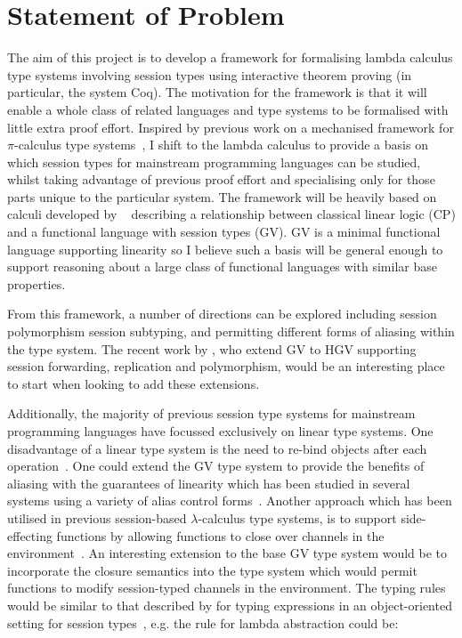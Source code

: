 \documentclass{mprop}
\newcommand{\1}{\textbf{1}\xspace}
\begin{document}
\section{Statement of Problem}

The aim of this project is to develop a framework for formalising lambda
calculus type systems involving session types using interactive theorem
proving (in particular, the system Coq). The motivation for the framework is
that it will enable a whole class of related languages and type systems to be
formalised with little extra proof effort. Inspired by previous work on a
mechanised framework for $\pi$-calculus type systems~\cite{Gay:2001:FFP}, I
shift to the lambda calculus to provide a basis on which session types for
mainstream programming languages can be studied, whilst taking advantage of
previous proof effort and specialising only for those parts unique to the
particular system. The framework will be heavily based on calculi developed by \citeauthor{Wadler:2012}~\cite{Wadler:2012} describing a relationship between classical linear logic (CP) and a functional language with session types (GV). GV is a minimal functional language supporting linearity so I believe such a basis will be general enough to support reasoning about a large class of functional languages with similar base properties.

From this framework, a number of directions can be explored including
session polymorphism session subtyping, and permitting different forms of
aliasing within the type system. The recent work by \citeauthor{Lindley:2014:SAP} \cite{Lindley:2014:SAP}, who extend GV to HGV supporting session forwarding, replication and polymorphism, would be an interesting place to start when looking to add these extensions.


Additionally, the majority of previous session type systems for mainstream programming languages have focussed exclusively on linear type systems. One disadvantage of a linear type system is the need to re-bind objects after each operation~\cite{Gay:2010:LAST}. One could extend the GV type system to provide the benefits of aliasing with the guarantees of linearity which has been studied in several systems using a variety of alias control forms~\cite{Fahndrich:2002,Mazurak:2010:LLT,Tov:2011}. Another approach which has been utilised in previous session-based $\lambda$-calculus type systems, is to support side-effecting functions by allowing functions to close over channels in the environment~\cite{Gay:2003:STI,Vasconcelos:2006:TCM}. An interesting extension to the base GV type system would be to incorporate the closure semantics into the type system which would permit functions to modify session-typed channels in the environment. The typing rules would be similar to that described by \citeauthor{Gay:2010:MST} for typing expressions in an object-oriented setting for session types~\cite{Gay:2010:MST}, e.g. the rule for lambda abstraction could be:
\end{document}
